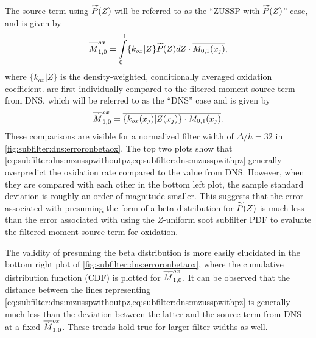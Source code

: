 The source term using $\pz$ will be referred to as the ``ZUSSP with $\pz$'' case, and is given by
\begin{equation}\label{eq:subfilter:dns:mzusspwithpz}
  \fst[M]{1,0}^{ox} = \int\limits_0^1 \{ k_{ox}|Z \}\pz dZ \cdot \mean{M_{0,1}(x_j)},
\end{equation}
where $\{ k_{ox}|Z \}$ is the density-weighted, conditionally averaged oxidation coefficient.  are first individually compared to the filtered moment source term from DNS, which will be referred to as the ``DNS'' case and is given by
\begin{equation}\label{eq:subfilter:dns:mdns}
  \fst[M]{1,0}^{ox} = \mean{\{ k_{ox}(x_j)|Z(x_j)\} \cdot M_{0,1}(x_j)}.
\end{equation}
These comparisons are visible for a normalized filter width of $\Delta/h = 32$ in \cref{fig:subfilter:dns:erroronbetaox}. The top two plots show that \cref{eq:subfilter:dns:mzusspwithoutpz,eq:subfilter:dns:mzusspwithpz} generally overpredict the oxidation rate compared to the value from DNS. However, when they are compared with each other in the bottom left plot, the sample standard deviation is roughly an order of magnitude smaller. This suggests that the error associated with presuming the form of a beta distribution for $\pz$ is much less than the error associated with using the $Z$-uniform soot subfilter PDF to evaluate the filtered moment source term for oxidation.

The validity of presuming the beta distribution is more easily elucidated in the bottom right plot of \cref{fig:subfilter:dns:erroronbetaox}, where the cumulative distribution function (CDF) is plotted for $\fst[M]{1,0}^{ox}$. It can be observed that the distance between the lines representing \cref{eq:subfilter:dns:mzusspwithoutpz,eq:subfilter:dns:mzusspwithpz} is generally much less than the deviation between the latter and the source term from DNS at a fixed $\fst[M]{1,0}^{ox}$. These trends hold true for larger filter widths as well. %

